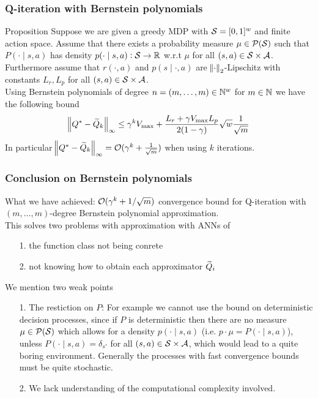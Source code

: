 \documentclass{beamer}[10]
\begin{document}
\begin{frame}
  \frametitle{Q-iteration with Bernstein polynomials}
  \begingroup
  \footnotesize
  \begin{block}{Proposition}
    Suppose we are given a greedy MDP with $\mathcal{S} = [0,1]^w$ and finite
    action space. Assume that there exists a probability measure
    $\mu \in \mathcal{P}(\mathcal{S})$ such that $P(\cdot \mid s, a)$ has density
    $p(\cdot \mid s, a) : \mathcal{S} \to \mathbb{R}$ w.r.t $\mu$ for all
    $(s, a) \in \mathcal{S} \times \mathcal{A}$. Furthermore assume that $r(\cdot, a)$
    and $p(s \mid \cdot, a)$ are $\norm{\cdot}_2$-Lipschitz with constants
    $L_r, L_p$ for all $(s, a) \in \mathcal{S} \times \mathcal{A}$.
    \\Using Bernstein polynomials of degree
    $n = (m, \dots, m) \in \mathbb{N}^w$ for $m \in \mathbb{N}$ we have the following bound
    \[ \norm{Q^* - \widetilde{Q}_k}_\infty \leq \gamma^{k} V_{\max}
      + \frac{L_r + \gamma V_{\max} L_p}{2(1-\gamma)} \sqrt{w}
    \frac{1}{\sqrt{m}} \]
    In particular $\norm{Q^* - \widetilde{Q}_k}_\infty
    = \mathcal{O}(\gamma^{k} + \frac{1}{\sqrt{m}})$
    when using $k$ iterations.
  \end{block} 
  \endgroup
\end{frame}

\begin{frame}
  \frametitle{Conclusion on Bernstein polynomials}
  \begingroup
  \footnotesize
  What we have achieved: $\mathcal{O}(\gamma^k + 1/\sqrt{m})$ convergence bound 
  for Q-iteration with $(m, \dots, m)$-degree Bernstein polynomial approximation.
  \\ This solves two problems with approximation with ANNs of
  \begin{itemize}
    \item[1.] the function class not being conrete
    \item[2.] not knowing
      how to obtain each approximator $\widetilde{Q}_i$
  \end{itemize}
  We mention two weak points
  \begin{itemize}
    \item[1.] The restiction on $P$:
      For example we cannot use the bound on deterministic
      decision processes, since if $P$ is deterministic then there
      are no measure $\mu \in \mathcal{P}(\mathcal{S})$ which allows for a
      density $p(\cdot \mid s, a)$ (i.e. $p \cdot \mu = P(\cdot \mid s, a)$),
      unless $P(\cdot \mid s, a) = \delta_{s'}$ for all $(s, a) \in \mathcal{S} \times
      \mathcal{A}$, which would lead to a quite boring environment.
      Generally the processes with fast convergence bounds
      must be quite stochastic.
    \item[2.] We lack understanding of the computational complexity involved. 
  \end{itemize}
  \endgroup
\end{frame}
\end{document}
